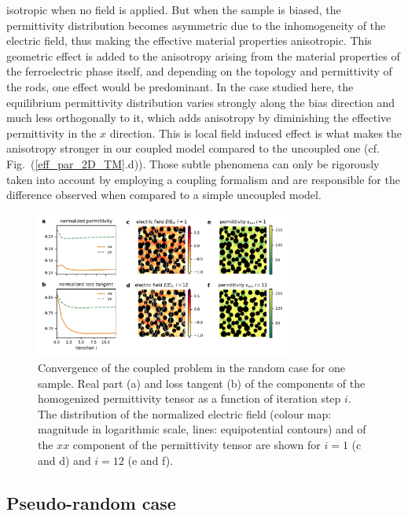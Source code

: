 \documentclass[%
 aip,
 amsmath,amssymb,
 reprint,%
]{revtex4-1}
\begin{document}
isotropic when no field is applied.
But when the sample is biased, the permittivity distribution becomes asymmetric due
to the inhomogeneity of the electric field, thus making the effective material properties anisotropic.
This geometric effect is added to the anisotropy arising from the material properties of the ferroelectric
phase itself, and depending on the topology and permittivity of the rods, one effect would be predominant.
In the case studied here, the equilibrium permittivity distribution varies strongly along the bias
 direction and much less orthogonally to it, which adds anisotropy by diminishing the effective
 permittivity in the $x$ direction. This is local field induced effect is what makes the anisotropy stronger
 in our coupled model compared to the uncoupled one (cf. Fig.~(\ref{eff_par_2D_TM}.d)).
Those subtle phenomena can only be rigorously taken into account by employing a coupling formalism
and are responsible for the difference observed when compared to a simple uncoupled model.\\
\begin{figure}[!t]
 \centering
 \includegraphics[width=0.75\textwidth]{convergence_rand}
 \caption{Convergence of the coupled problem in the random case
  for one sample.
  Real part (a) and loss tangent (b) of the components of the homogenized
  permittivity tensor as a function of iteration step $i$. The distribution of
  the normalized electric field (colour map: magnitude in logarithmic scale,
  lines: equipotential contours) and of the $xx$ component of the permittivity tensor are shown for $i=1$
  (c and d) and $i=12$ (e and f).
 }
 \label{conv_random}
\end{figure}

\subsection{Pseudo-random case}
\end{document}
